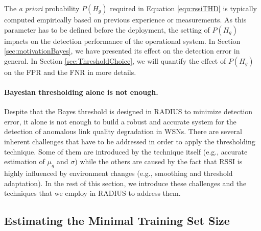 The \textit{a priori} probability $P(H_g)$ required in Equation \ref{equ:rssiTHD} is typically computed empirically based on previous experience or measurements. As this parameter has to be defined before the deployment, the setting of $P(H_g)$ impacts on the detection performance of the operational system. In Section \ref{sec:motivationBayes}, we have presented its effect on the detection error in general. In Section \ref{sec:ThresholdChoice}, we will quantify the effect of $P(H_g)$ on the FPR and the FNR in more details.


\paragraph{Bayesian thresholding alone is not enough.} Despite that the Bayes threshold is designed in RADIUS to minimize detection error, it alone is not enough to build a robust and accurate system for the detection of anomalous link quality degradation in WSNs. There are several inherent challenges that have to be addressed in order to apply the thresholding technique. Some of them are introduced by the technique itself (e.g., accurate estimation of $\mu_{g}$ and $\sigma$) while the others are caused by the fact that RSSI is highly influenced by environment changes (e.g., smoothing and threshold adaptation). In the rest of this section, we introduce these challenges and the techniques that we employ in RADIUS to address them.

\subsection{Estimating the Minimal Training Set Size}\label{sec:minTrainingSet}

